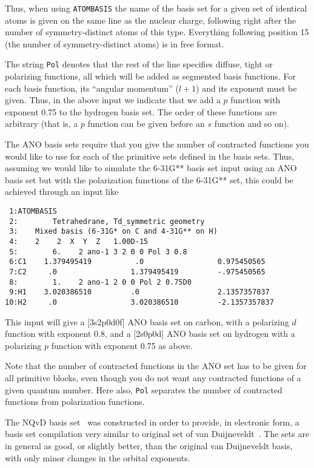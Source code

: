 Thus, when using {\tt ATOMBASIS} the name of the
basis set for a given
set of identical atoms is given on the same line as the nuclear
charge, following right after the number of symmetry-distinct atoms of
this type. Everything following position 15 (the number of
symmetry-distinct atoms) is in free format.

The string {\tt Pol} denotes that the rest of the line specifies
diffuse, tight or polarizing
functions, all which will be added as segmented basis functions.
For each basis function, its ``angular momentum'' ($l+1$) and its
exponent must be given. Thus, in the above input we indicate that
we add a $p$ function with exponent 0.75 to the hydrogen basis
set. The order of these functions are arbitrary (that is, a $p$
function can be given before an $s$ function and so on).

The ANO basis sets require that you give the number of contracted
functions you would like to use for each of the primitive sets defined
in the basis sets. Thus, assuming we would like to simulate the
6-31G** basis set input using an ANO basis set but with the
polarization functions of the 6-31G** set, this could be achieved
through an input like

\begin{verbatim}
 1:ATOMBASIS
 2:        Tetrahedrane, Td_symmetric geometry
 3:    Mixed basis (6-31G* on C and 4-31G** on H)
 4:    2    2  X  Y  Z   1.00D-15
 5:        6.    2 ano-1 3 2 0 0 Pol 3 0.8
 6:C1    1.379495419          .0                 0.975450565
 7:C2     .0                 1.379495419         -.975450565
 8:        1.    2 ano-1 2 0 0 Pol 2 0.75D0
 9:H1    3.020386510         .0                  2.1357357837
10:H2     .0                 3.020386510         -2.1357357837
\end{verbatim}

This input will give a [3s2p0d0f] ANO basis set
on carbon, with a
polarizing $d$ function with exponent 0.8, and a [2s0p0d] ANO basis
set on hydrogen with a polarizing $p$ function with exponent 0.75 as
above.

Note that the number of contracted functions in the ANO set has to be
given for all primitive blocks, even though you do not want any
contracted functions of a given quantum number. Here also, {\tt Pol}
separates the number of contracted functions from polarization
functions.

The NQvD basis set~\cite{nqvdref} was constructed in order to provide,
in electronic form, a basis set compilation very similar to original
set of van Duijneveldt~\cite{fbvdibmrap}. The
sets are in general as
good, or slightly better, than the original van Duijneveldt basis,
with only minor changes in the orbital exponents.

